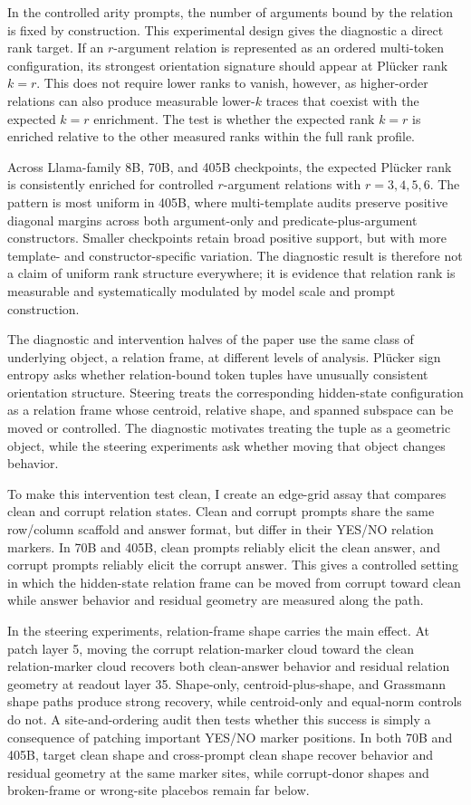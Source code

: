 \documentclass[11pt]{article}
\begin{document}
In the controlled arity prompts, the number of arguments bound by the relation is fixed by construction. This experimental design gives the diagnostic a direct rank target. If an $r$-argument relation is represented as an ordered multi-token configuration, its strongest orientation signature should appear at Pl\"ucker rank $k=r$. This does not require lower ranks to vanish, however, as higher-order relations can also produce measurable lower-$k$ traces that coexist with the expected $k=r$ enrichment. The test is whether the expected rank $k=r$ is enriched relative to the other measured ranks within the full rank profile.

Across Llama-family 8B, 70B, and 405B checkpoints, the expected Pl\"ucker rank is consistently enriched for controlled $r$-argument relations with $r=3,4,5,6$. The pattern is most uniform in 405B, where multi-template audits preserve positive diagonal margins across both argument-only and predicate-plus-argument constructors. Smaller checkpoints retain broad positive support, but with more template- and constructor-specific variation. The diagnostic result is therefore not a claim of uniform rank structure everywhere; it is evidence that relation rank is measurable and systematically modulated by model scale and prompt construction.

The diagnostic and intervention halves of the paper use the same class of underlying object, a relation frame, at different levels of analysis. Pl\"ucker sign entropy asks whether relation-bound token tuples have unusually consistent orientation structure. Steering treats the corresponding hidden-state configuration as a relation frame whose centroid, relative shape, and spanned subspace can be moved or controlled. The diagnostic motivates treating the tuple as a geometric object, while the steering experiments ask whether moving that object changes behavior.

To make this intervention test clean, I create an edge-grid assay that compares clean and corrupt relation states. Clean and corrupt prompts share the same row/column scaffold and answer format, but differ in their YES/NO relation markers. In 70B and 405B, clean prompts reliably elicit the clean answer, and corrupt prompts reliably elicit the corrupt answer. This gives a controlled setting in which the hidden-state relation frame can be moved from corrupt toward clean while answer behavior and residual geometry are measured along the path.

In the steering experiments, relation-frame shape carries the main effect. At patch layer 5, moving the corrupt relation-marker cloud toward the clean relation-marker cloud recovers both clean-answer behavior and residual relation geometry at readout layer 35. Shape-only, centroid-plus-shape, and Grassmann shape paths produce strong recovery, while centroid-only and equal-norm controls do not. A site-and-ordering audit then tests whether this success is simply a consequence of patching important YES/NO marker positions. In both 70B and 405B, target clean shape and cross-prompt clean shape recover behavior and residual geometry at the same marker sites, while corrupt-donor shapes and broken-frame or wrong-site placebos remain far below.
\end{document}
